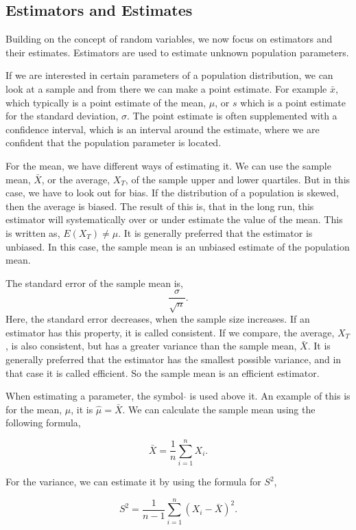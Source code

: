 \subsection{Estimators and Estimates}
Building on the concept of random variables, we now focus on estimators and their estimates. Estimators are used to estimate unknown population parameters. \newline

\noindent If we are interested in certain parameters of a population distribution, we can look at a sample and from there we can make a point estimate. For example $\bar{x}$, which typically is a point estimate of the mean, $\mu$, or $s$ which is a point estimate for the standard deviation, $\sigma$. The point estimate is often supplemented with a confidence interval, which is an interval around the estimate, where we are confident that the population parameter is located.
\newline

\noindent For the mean, we have different ways of estimating it. We can use the sample mean, $\bar{X}$, or the average, $X_T$, of the sample upper and lower quartiles. 
But in this case, we have to look out for bias. If the distribution of a population is skewed, then the average is biased. The result of this is, that in the long run, this estimator will systematically over or under estimate the value of the mean. This is written as, $E(X_T) \neq \mu$. It is generally preferred that the estimator is unbiased. In this case, the sample mean is an unbiased estimate of the population mean.
\newline

\noindent The standard error of the sample mean is,
\begin{equation}
 \frac{\sigma}{\sqrt{n}} .
\end{equation}
Here, the standard error decreases, when the sample size increases. If an estimator has this property, it is called consistent. If we compare, the average, $X_T$, is also consistent, but has a greater variance than the sample mean, $\bar{X}$. It is generally preferred that the estimator has the smallest possible variance, and in that case it is called efficient. So the sample mean is an efficient estimator.\newline

\noindent When estimating a parameter, the symbol $\hat{}$ is used above it. An example of this is for the mean, $\mu$, it is $\hat{\mu} = \bar{X}$. We can calculate the sample mean using the following formula,

\begin{equation}
	\bar{X}=\frac{1}{n} \sum_{i=1}^{n}X_i.
\end{equation}


\noindent For the variance, we can estimate it by using the formula for $S^2$,

\begin{equation}
	S^2=\frac{1}{n-1} \sum_{i=1}^{n}(X_i-\bar{X})^2.
\end{equation}
